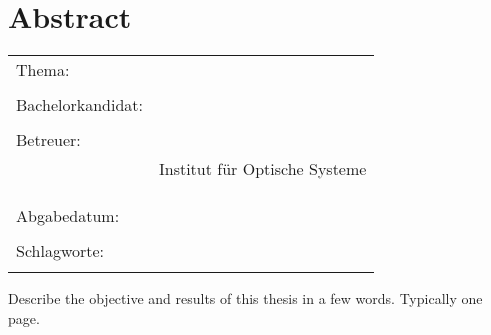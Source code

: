 \thispagestyle{plain}
\chapter*{Abstract}

\bigskip

\begin{center}
	\begin{tabular}{p{3.2cm}p{9.6cm}}
		Thema: & \thema \\
		 & \\
		Bachelorkandidat: & \autor \\
		 & \\
		Betreuer: & \prueferA \\[.5ex]
		 & Institut für Optische Systeme\\[3ex]
		 & \prueferB \\[.5ex]
		 & \firma \\
		 & \\
		Abgabedatum: & \abgabedatum \\
		 & \\
		Schlagworte: & \schlagworte \\
		 & \\
	\end{tabular}
\end{center}

\bigskip

\noindent

Describe the objective and results of this thesis in a few words.
Typically one page.

\newpage
